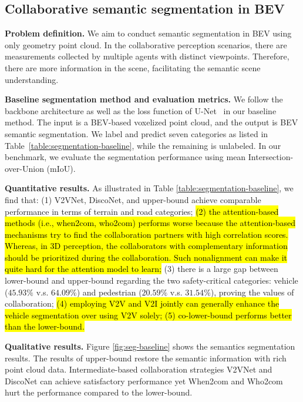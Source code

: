 \subsection{Collaborative semantic segmentation in BEV}

\textbf{Problem definition.} 
We aim to conduct semantic segmentation in BEV using only geometry point cloud. In the collaborative perception scenarios, there are measurements collected by multiple agents with distinct viewpoints. Therefore, there are more information in the scene, facilitating the semantic scene understanding.

\textbf{Baseline segmentation method and evaluation metrics.} 
We follow the backbone architecture as well as the loss function of U-Net~\cite{Ronneberger2015} in our baseline method. The input is a BEV-based voxelized point cloud, and the output is BEV semantic segmentation. We label and predict seven categories as listed in Table~\ref{table:segmentation-baseline}, while the remaining is unlabeled. In our benchmark, we evaluate the segmentation performance using mean Intersection-over-Union (mIoU).

\textbf{Quantitative results.} As illustrated in Table \ref{table:segmentation-baseline}, we find that: (1) V2VNet, DiscoNet, and upper-bound achieve comparable performance in terms of terrain and road categories; \hl{(2) the attention-based methods (i.e., when2com, who2com) performs worse because the attention-based mechanisms try to find the collaboration partners with high correlation scores. Whereas, in 3D perception, the collaborators with complementary information should be prioritized during the collaboration. Such nonalignment can make it quite hard for the attention model to learn;} (3) there is a large gap between lower-bound and upper-bound regarding the two safety-critical categories: vehicle ($45.93\%$ v.s. $64.09\%$) and pedestrian ($20.59\%$ v.s. $31.54\%$), proving the values of collaboration; \hl{(4) employing V2V and V2I jointly can generally enhance the vehicle segmentation over using V2V solely; (5) co-lower-bound  performs better than the lower-bound.}

\textbf{Qualitative results.}
Figure \ref{fig:seg-baseline} shows the semantics segmentation results. The results of upper-bound restore the semantic information with rich point cloud data. Intermediate-based collaboration strategies V2VNet and DiscoNet can achieve satisfactory performance yet When2com and Who2com hurt the performance compared to the lower-bound.


